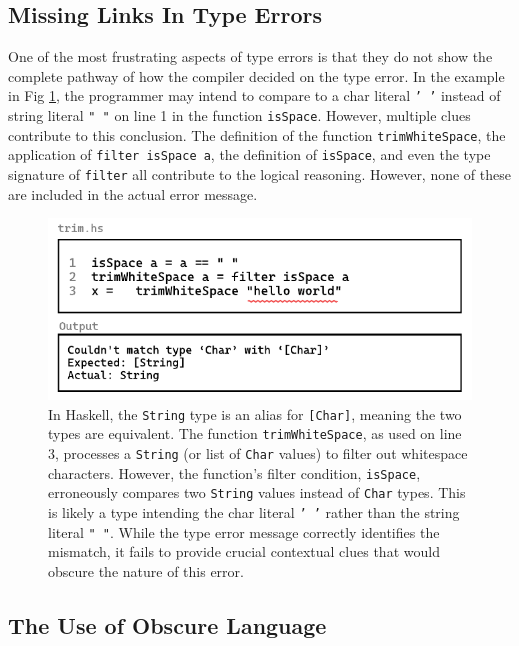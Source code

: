 \subsection{Missing Links In Type Errors}
\label{subsec:missing-link}

One of the most frustrating aspects of type errors is that they do not show the complete pathway of how the compiler decided on the type error. In the example in Fig \ref{fig:type-error-example-3}, the programmer may intend to compare to a char literal \texttt{' '} instead of string literal \texttt{" "} on line 1 in the function \texttt{isSpace}. However, multiple clues contribute to this conclusion. The definition of the function \texttt{trimWhiteSpace}, the application of \texttt{filter isSpace a}, the definition of \texttt{isSpace}, and even the type signature of \texttt{filter} all contribute to the logical reasoning. However, none of these are included in the actual error message.


\begin{figure}[htbp]
\centering  \includegraphics[width=\linewidth]{TypeErrorExample3}
  \caption[A type error in Haskell involving a type mismatch across multiple functions]{
    \label{fig:type-error-example-3}
    In Haskell, the \texttt{String} type is an alias for \texttt{[Char]}, meaning the two types are equivalent. The function \texttt{trimWhiteSpace}, as used on line 3, processes a \texttt{String} (or list of \texttt{Char} values) to filter out whitespace characters. However, the function’s filter condition, \texttt{isSpace}, erroneously compares two \texttt{String} values instead of \texttt{Char} types. This is likely a type intending the char literal \texttt{' '} rather than the string literal \texttt{" "}. While the type error message correctly identifies the mismatch, it fails to provide crucial contextual clues that would obscure the nature of this error.
    }
\end{figure}


\subsection{The Use of Obscure Language}

